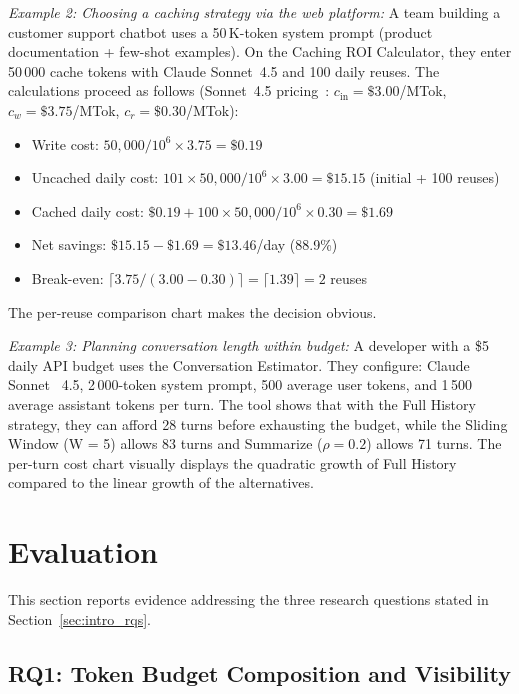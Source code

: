 \documentclass[a4paper,fleqn]{cas-dc}
\begin{document}
\textit{Example 2: Choosing a caching strategy via the web platform:} A team building a customer support chatbot uses a 50\,K-token system prompt (product documentation + few-shot examples).
On the Caching ROI Calculator, they enter 50\,000 cache tokens with Claude Sonnet~4.5 and 100 daily reuses. The calculations proceed as follows (Sonnet~4.5 pricing~\cite{anthropic2026pricing}: $c_{\text{in}} = \$3.00$/MTok, $c_w = \$3.75$/MTok, $c_r = \$0.30$/MTok):
\begin{itemize}
  \item Write cost: $50{,}000 / 10^6 \times 3.75 = \$0.19$
  \item Uncached daily cost: $101 \times 50{,}000 / 10^6 \times 3.00 = \$15.15$ (initial + 100 reuses)
  \item Cached daily cost: $\$0.19 + 100 \times 50{,}000 / 10^6 \times 0.30 = \$1.69$
  \item Net savings: $\$15.15 - \$1.69 = \$13.46$/day (88.9\%)
  \item Break-even: $\lceil 3.75 / (3.00 - 0.30) \rceil = \lceil 1.39 \rceil = 2$ reuses
\end{itemize}
The per-reuse comparison chart makes the decision obvious.

\textit{Example 3: Planning conversation length within budget:} A developer with a \$5 daily API budget uses the Conversation Estimator. 
They configure: Claude Sonnet ~4.5, 2\,000-token system prompt, 500 average user tokens, and 1\,500 average assistant tokens per turn. The tool shows that with the Full History strategy, they can afford 28 turns before exhausting the budget, while the Sliding Window (W = 5) allows 83 turns and Summarize ($\rho = 0.2$) allows 71 turns. The per-turn cost chart visually displays the quadratic growth of Full History compared to the linear growth of the alternatives.


\section{Evaluation}
\label{sec:impact}

This section reports evidence addressing the three research questions stated in Section~\ref{sec:intro_rqs}.

\subsection{RQ1: Token Budget Composition and Visibility}
\label{sec:rq1}
\end{document}
